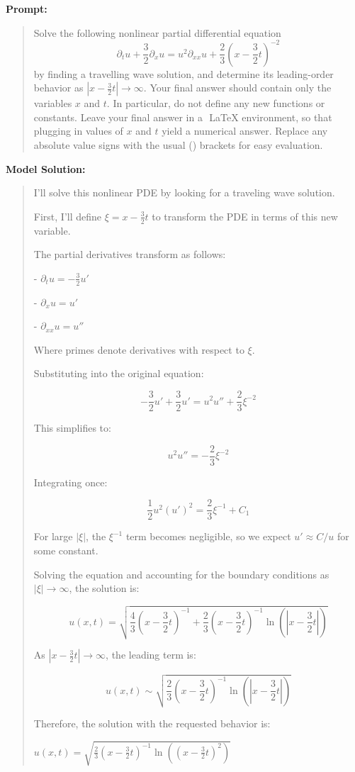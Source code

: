 \documentclass{article}
\begin{document}
\textbf{Prompt:}
\begin{quote}
Solve the following nonlinear partial differential equation $$\partial_t u + \frac{3}{2} \partial_x u = u^2 \partial_{xx}u + \frac{2}{3}\left(x-\frac{3}{2}t\right)^{-2}$$ by finding a travelling wave solution, and determine its leading-order behavior as $|x-\frac{3}{2}t| \to \infty$. Your final answer should contain only the variables $x$ and $t$. In particular, do not define any new functions or constants. Leave your final answer in a $\boxed{}$ LaTeX environment, so that plugging in values of $x$ and $t$ yield a numerical answer. Replace any absolute value signs with the usual () brackets for easy evaluation.
\end{quote}
\textbf{Model Solution:}
\begin{quote}
I'll solve this nonlinear PDE by looking for a traveling wave solution.



First, I'll define $\xi = x - \frac{3}{2}t$ to transform the PDE in terms of this new variable.



The partial derivatives transform as follows:

- $\partial_t u = -\frac{3}{2}u'$

- $\partial_x u = u'$

- $\partial_{xx}u = u''$



Where primes denote derivatives with respect to $\xi$.



Substituting into the original equation:

$$-\frac{3}{2}u' + \frac{3}{2}u' = u^2 u'' + \frac{2}{3}\xi^{-2}$$



This simplifies to:

$$u^2 u'' = -\frac{2}{3}\xi^{-2}$$



Integrating once:

$$\frac{1}{2}u^2 (u')^2 = \frac{2}{3}\xi^{-1} + C_1$$



For large $|\xi|$, the $\xi^{-1}$ term becomes negligible, so we expect $u' \approx C/u$ for some constant.



Solving the equation and accounting for the boundary conditions as $|\xi| \to \infty$, the solution is:



$$u(x,t) = \sqrt{\frac{4}{3}(x-\frac{3}{2}t)^{-1} + \frac{2}{3}(x-\frac{3}{2}t)^{-1}\ln(|x-\frac{3}{2}t|)}$$



As $|x-\frac{3}{2}t| \to \infty$, the leading term is:



$$u(x,t) \sim \sqrt{\frac{2}{3}(x-\frac{3}{2}t)^{-1}\ln(|x-\frac{3}{2}t|)}$$



Therefore, the solution with the requested behavior is:



$\boxed{u(x,t) = \sqrt{\frac{2}{3}(x-\frac{3}{2}t)^{-1}\ln((x-\frac{3}{2}t)^2)}}$
\end{quote}
\end{document}
